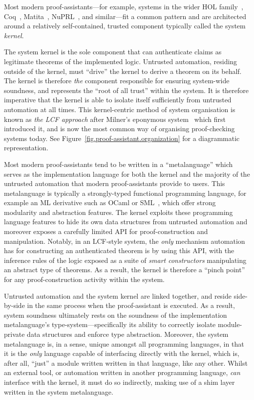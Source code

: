 \documentclass[a4paper, UKenglish, cleveref, autoref, thm-restate, colorlinks]{lipics-v2021}
\begin{document}
Most modern proof-assistants---for example, systems in the wider HOL family~\cite{10.1007/s00165-019-00492-1, DBLP:conf/tphol/Harrison09a, DBLP:conf/tphol/SlindN08}, Coq~\cite{DBLP:conf/popl/HuetH14}, Matita~\cite{DBLP:conf/cade/AspertiRCT11}, NuPRL~\cite{DBLP:conf/cade/AllenCEKL00}, and similar---fit a common pattern and are architected around a relatively self-contained, trusted component typically called the system \emph{kernel}.

The system kernel is the sole component that can authenticate claims as legitimate theorems of the implemented logic.
Untrusted automation, residing outside of the kernel, must ``drive'' the kernel to derive a theorem on its behalf.
The kernel is therefore \emph{the} component responsible for ensuring system-wide soundness, and represents the ``root of all trust'' within the system.
It is therefore imperative that the kernel is able to isolate itself sufficiently from untrusted automation at all times.
This kernel-centric method of system organisation is known as \emph{the LCF approach} after Milner's eponymous system~\cite{DBLP:books/sp/Gordon79} which first introduced it, and is now the most common way of organising proof-checking systems today.
See Figure~\ref{fig.proof-assistant.organization} for a diagrammatic representation.

Most modern proof-assistants tend to be written in a ``metalanguage'' which serves as the implementation language for both the kernel and the majority of the untrusted automation that modern proof-assistants provide to users.
This metalanguage is typically a strongly-typed functional programming language, for example an ML derivative such as OCaml or SML~\cite{DBLP:books/daglib/0069232}, which offer strong modularity and abstraction features.
The kernel exploits these programming language features to hide its own data structures from untrusted automation and moreover exposes a carefully limited API for proof-construction and manipulation.
Notably, in an LCF-style system, the \emph{only} mechanism automation has for constructing an authenticated theorem is by using this API, with the inference rules of the logic exposed as a suite of \emph{smart constructors} manipulating an abstract type of theorems.
As a result, the kernel is therefore a ``pinch point'' for any proof-construction activity within the system.

Untrusted automation and the system kernel are linked together, and reside side-by-side in the same process when the proof-assistant is executed.
As a result, system soundness ultimately rests on the soundness of the implementation metalanguage's type-system---specifically its ability to correctly isolate module-private data structures and enforce type abstraction.
Moreover, the system metalanguage is, in a sense, unique amongst all programming languages, in that it is the \emph{only} language capable of interfacing directly with the kernel, which is, after all, ``just'' a module written written in that language, like any other.
Whilst an external tool, or automation written in another programming language, \emph{can} interface with the kernel, it must do so indirectly, making use of a shim layer written in the system metalanguage.
\end{document}
